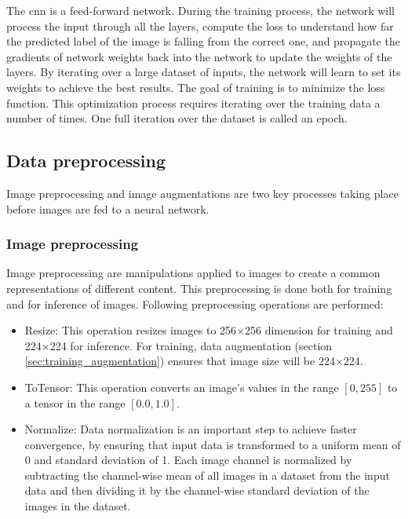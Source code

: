 The \acrshort{cnn} is a feed-forward network. During the training process, the network will process the input through all the layers, compute the loss to understand how far the predicted label of the image is falling from the correct one, and propagate the gradients of network weights back into the network to update the weights of the layers. By iterating over a large dataset of inputs, the network will learn to set its weights to achieve the best results. The goal of training is to minimize the loss function. This optimization process requires iterating over the training data a number of times. One full iteration over the dataset is called an epoch.

\subsection{Data preprocessing}
Image preprocessing and image augmentations are two key processes taking place before images are fed to a neural network.

\subsubsection{Image preprocessing}
Image preprocessing are manipulations applied to images to create a common representations of different content. This preprocessing is done both for training and for inference of images. Following preprocessing operations are performed:
\begin{itemize}
    \item Resize: This operation resizes images to 256$\times$256 dimension for training and 224$\times$224 for inference. For training, data augmentation (section \ref{sec:training_augmentation}) ensures that image size will be 224$\times$224.
    \item ToTensor: This operation converts an image's values in the range $[0, 255]$ to a tensor in the range $[0.0, 1.0]$.
    \item Normalize: Data normalization is an important step to achieve faster convergence, by ensuring that input data is transformed to a uniform mean of 0 and standard deviation of 1. Each image channel is normalized by subtracting the channel-wise mean of all images in a dataset from the input data and then dividing it by the channel-wise standard deviation of the images in the dataset.
\end{itemize}


